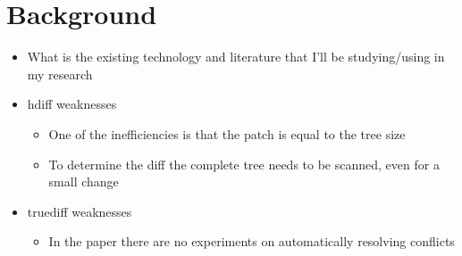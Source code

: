 \section{Background}
\begin{itemize}
    \item What is the existing technology and literature that I'll be studying/using in my research
    \item hdiff weaknesses
    \begin{itemize}
        \item One of the inefficiencies is that the patch is equal to the tree size
        \item To determine the diff the complete tree needs to be scanned, even for a small change
    \end{itemize}
    \item truediff weaknesses
    \begin{itemize}
        \item In the paper there are no experiments on automatically resolving conflicts
    \end{itemize}
\end{itemize}
